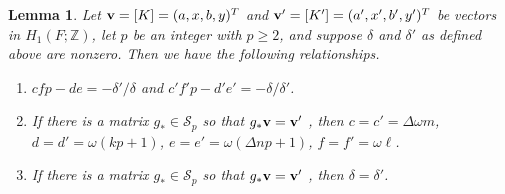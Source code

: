\documentclass{amsart}     %
\newtheorem{lem}[thm]{Lemma}          %
\theoremstyle{definition}
\begin{document}
\begin{lem}\label{lem:variablefacts}
Let ${\bf{v}} = [K] = (a, x, b, y)^T$ and ${\bf{v}}'= [K'] = (a', x', b', y')^T$ be vectors in $H_1(F; \mathbb{Z})$, let $p$ be an integer with $p \ge 2$, and suppose $\delta$ and $\delta'$ as defined above are nonzero. Then we have the following relationships. 

\begin{enumerate}

\item\label{lem:cfpminusde}  $cfp - de = - \delta' /\delta$ and $ c'  f' p -  d'  e' = - \delta/ \delta'$.

\item\label{lem:cdefvsklmn} If there is a matrix $g_* \in \mathcal S_p$ so that $g_* {\bf v} = {\bf v}'$
, then $c=  c' = \Delta \omega  m$, $d = d' = \omega( kp + 1)$, $e=  e'  = \omega(\Delta np + 1)$, $f =  f'  =  \omega \ell$. 

\item\label{lem:deltavsdeltaprime} If there is a matrix $g_* \in \mathcal S_p$ so that $g_* {\bf v} = {\bf v}'$
, then $\delta = \delta'$.
\end{enumerate}
\end{lem}
\end{document}
